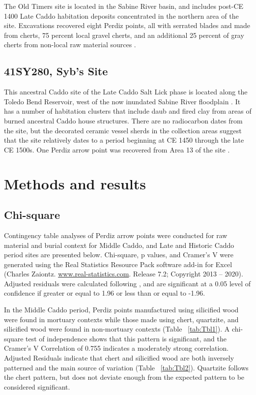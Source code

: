 \documentclass[review]{elsarticle}
\begin{document}
The Old Timers site is located in the Sabine River basin, and includes post-CE 1400 Late Caddo habitation deposits concentrated in the northern area of the site. Excavations recovered eight Perdiz points, all with serrated blades and made from cherts, 75 percent local gravel cherts, and an additional 25 percent of gray cherts from non-local raw material sources \citep[77]{RN8966}.

\subsection*{41SY280, Syb’s Site} 

This ancestral Caddo site of the Late Caddo Salt Lick phase is located along the Toledo Bend Reservoir, west of the now inundated Sabine River floodplain \citep[Figure 55]{RN8966}. It has a number of habitation clusters that include daub and fired clay from areas of burned ancestral Caddo house structures. There are no radiocarbon dates from the site, but the decorated ceramic vessel sherds in the collection areas suggest that the site relatively dates to a period beginning at CE 1450 through the late CE 1500s. One Perdiz arrow point was recovered from Area 13 of the site \citep[Table 33]{RN8966}.

\section*{Methods and results}

\subsection*{Chi-square}

Contingency table analyses of Perdiz arrow points were conducted for raw material and burial context for Middle Caddo, and Late and Historic Caddo period sites are presented below. Chi-square, p values, and Cramer’s V were generated using the Real Statistics Resource Pack software add-in for Excel (Charles Zaiontz. \href{www.real-statistics.com}{www.real-statistics.com}. Release 7.2; Copyright 2013 – 2020). Adjusted residuals were calculated following \citet{RN8987}, and are significant at a 0.05 level of confidence if greater or equal to 1.96 or less than or equal to -1.96. 

In the Middle Caddo period, Perdiz points manufactured using silicified wood were found in mortuary contexts while those made using chert, quartzite, and silicified wood were found in non-mortuary contexts (Table ~\ref{tab:Tbl1}). A chi-square test of independence shows that this pattern is significant, and the Cramer’s V Correlation of 0.755 indicates a moderately strong correlation. Adjusted Residuals indicate that chert and silicified wood are both inversely patterned and the main source of variation (Table ~\ref{tab:Tbl2}). Quartzite follows the chert pattern, but does not deviate enough from the expected pattern to be considered significant.
\end{document}
